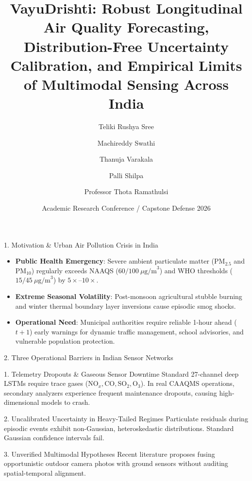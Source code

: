 \documentclass[aspectratio=169]{beamer}
\title[VayuDrishti]{VayuDrishti: Robust Longitudinal Air Quality Forecasting, Distribution-Free Uncertainty Calibration, and Empirical Limits of Multimodal Sensing Across India}
\author[Sree et al.]{
  Teliki Rushya Sree\inst{1} \and 
  Machireddy Swathi\inst{1} \and 
  Thanuja Varakala\inst{1} \and 
  Palli Shilpa\inst{1} \and 
  Professor Thota Ramathulsi\inst{2}
}
\institute[CSE Dept]{
  \inst{1} Department of Computer Science and Engineering \and
  \inst{2} Project Guide (Guided by Professor Thota Ramathulsi)
}
\date[Conference 2026]{Academic Research Conference / Capstone Defense 2026}
\begin{document}
\begin{frame}
  \titlepage
\end{frame}

\begin{frame}{1. Motivation \& Urban Air Pollution Crisis in India}
  \begin{itemize}
    \item \textbf{Public Health Emergency}: Severe ambient particulate matter ($\text{PM}_{2.5}$ and $\text{PM}_{10}$) regularly exceeds NAAQS ($60/100\ \mu\text{g/m}^3$) and WHO thresholds ($15/45\ \mu\text{g/m}^3$) by $5\times$--$10\times$.
    \item \textbf{Extreme Seasonal Volatility}: Post-monsoon agricultural stubble burning and winter thermal boundary layer inversions cause episodic smog shocks.
    \item \textbf{Operational Need}: Municipal authorities require reliable 1-hour ahead ($t+1$) early warnings for dynamic traffic management, school advisories, and vulnerable population protection.
  \end{itemize}
\end{frame}

\begin{frame}{2. Three Operational Barriers in Indian Sensor Networks}
  \begin{block}{1. Telemetry Dropouts \& Gaseous Sensor Downtime}
    Standard 27-channel deep LSTMs require trace gases ($\text{NO}_x, \text{CO}, \text{SO}_2, \text{O}_3$). In real CAAQMS operations, secondary analyzers experience frequent maintenance dropouts, causing high-dimensional models to crash.
  \end{block}
  \begin{block}{2. Uncalibrated Uncertainty in Heavy-Tailed Regimes}
    Particulate residuals during episodic events exhibit non-Gaussian, heteroskedastic distributions. Standard Gaussian confidence intervals fail.
  \end{block}
  \begin{block}{3. Unverified Multimodal Hypotheses}
    Recent literature proposes fusing opportunistic outdoor camera photos with ground sensors without auditing spatial-temporal alignment.
  \end{block}
\end{frame}
\end{document}
